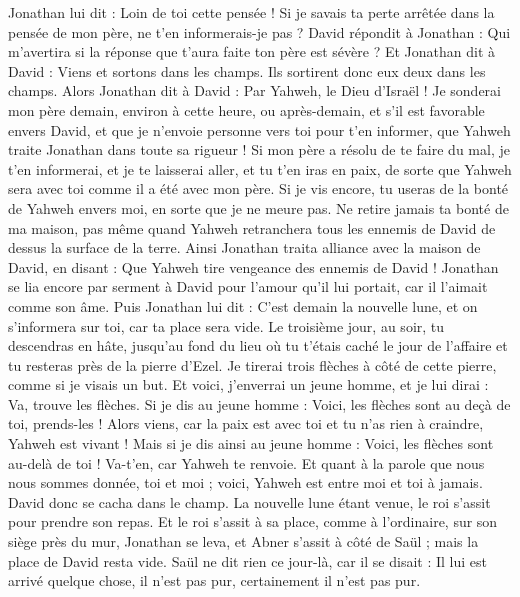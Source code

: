 \begin{multicols}{2}
Jonathan lui dit : Loin de toi cette pensée ! Si je savais ta perte arrêtée dans la pensée de mon père, ne t'en informerais-je pas ?
David répondit à Jonathan : Qui m'avertira si la réponse que t'aura faite ton père est sévère ?
Et Jonathan dit à David : Viens et sortons dans les champs. Ils sortirent donc eux deux dans les champs.
Alors Jonathan dit à David : Par Yahweh, le Dieu d'Israël ! Je sonderai mon père demain, environ à cette heure, ou après-demain, et s'il est favorable envers David, et que je n'envoie personne vers toi pour t'en informer,
que Yahweh traite Jonathan dans toute sa rigueur ! Si mon père a résolu de te faire du mal, je t'en informerai, et je te laisserai aller, et tu t'en iras en paix, de sorte que Yahweh sera avec toi comme il a été avec mon père.
Si je vis encore, tu useras de la bonté de Yahweh envers moi, en sorte que je ne meure pas.
Ne retire jamais ta bonté de ma maison, pas même quand Yahweh retranchera tous les ennemis de David de dessus la surface de la terre.
Ainsi Jonathan traita alliance avec la maison de David, en disant : Que Yahweh tire vengeance des ennemis de David !
Jonathan se lia encore par serment à David pour l'amour qu'il lui portait, car il l'aimait comme son âme.
Puis Jonathan lui dit : C'est demain la nouvelle lune, et on s'informera sur toi, car ta place sera vide.
Le troisième jour, au soir, tu descendras en hâte, jusqu'au fond du lieu où tu t'étais caché le jour de l'affaire et tu resteras près de la pierre d'Ezel.
Je tirerai trois flèches à côté de cette pierre, comme si je visais un but.
Et voici, j'enverrai un jeune homme, et je lui dirai : Va, trouve les flèches. Si je dis au jeune homme : Voici, les flèches sont au deçà de toi, prends-les ! Alors viens, car la paix est avec toi et tu n'as rien à craindre, Yahweh est vivant !
Mais si je dis ainsi au jeune homme : Voici, les flèches sont au-delà de toi ! Va-t'en, car Yahweh te renvoie.
Et quant à la parole que nous nous sommes donnée, toi et moi ; voici, Yahweh est entre moi et toi à jamais.
David donc se cacha dans le champ. La nouvelle lune étant venue, le roi s'assit pour prendre son repas.
Et le roi s'assit à sa place, comme à l'ordinaire, sur son siège près du mur, Jonathan se leva, et Abner s'assit à côté de Saül ; mais la place de David resta vide.
Saül ne dit rien ce jour-là, car il se disait : Il lui est arrivé quelque chose, il n'est pas pur, certainement il n'est pas pur.

\end{multicols}
